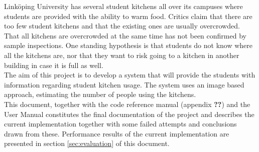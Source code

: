 Linköping University has several student kitchens all over its campuses where students are provided with the ability to warm food. Critics claim that there are too few student kitchens and that the existing ones are usually overcrowded. That all kitchens are overcrowded at the same time has not been confirmed by sample inspections. One standing hypothesis is that students do not know where all the kitchens are, nor that they want to risk going to a kitchen in another building in case it is full as well.\\

The aim of this project is to develop a system that will provide the students with information regarding student kitchen usage. The system uses an image based approach, estimating the number of people using the kitchens.\\

This document, together with the code reference manual (appendix \textbf{??}) and the User Manual constitutes the final documentation of the project and describes the current implementation together with some failed attempts and conclusions drawn from these. Performance results of the current implementation are presented in section \ref{sec:evaluation} of this document.